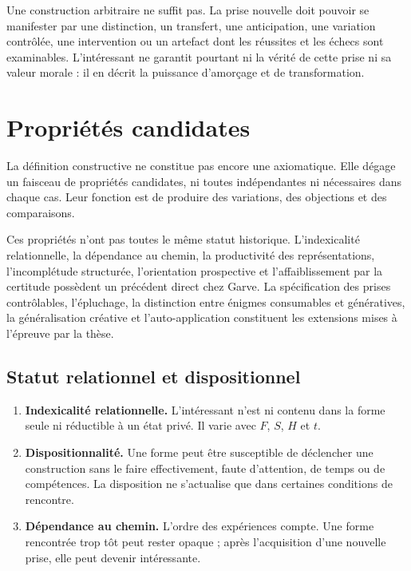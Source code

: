 \documentclass[11pt,a4paper]{article}
\begin{document}
Une construction arbitraire ne suffit pas. La prise nouvelle doit pouvoir se
manifester par une distinction, un transfert, une anticipation, une variation
contrôlée, une intervention ou un artefact dont les réussites et les échecs sont
examinables. L'intéressant ne garantit pourtant ni la vérité de cette prise ni
sa valeur morale : il en décrit la puissance d'amorçage et de transformation.

\section{Propriétés candidates}

La définition constructive ne constitue pas encore une axiomatique. Elle dégage
un faisceau de propriétés candidates, ni toutes indépendantes ni nécessaires
dans chaque cas. Leur fonction est de produire des variations, des objections
et des comparaisons.

Ces propriétés n'ont pas toutes le même statut historique. L'indexicalité
relationnelle, la dépendance au chemin, la productivité des représentations,
l'incomplétude structurée, l'orientation prospective et l'affaiblissement par
la certitude possèdent un précédent direct chez Garve. La spécification des
prises contrôlables, l'épluchage, la distinction entre énigmes consumables et
génératives, la généralisation créative et l'auto-application constituent les
extensions mises à l'épreuve par la thèse.

\subsection{Statut relationnel et dispositionnel}

\begin{enumerate}
  \item \textbf{Indexicalité relationnelle.} L'intéressant n'est ni contenu
        dans la forme seule ni réductible à un état privé. Il varie avec
        \(F\), \(S\), \(H\) et \(t\).
  \item \textbf{Dispositionnalité.} Une forme peut être susceptible de
        déclencher une construction sans le faire effectivement, faute
        d'attention, de temps ou de compétences. La disposition ne s'actualise
        que dans certaines conditions de rencontre.
  \item \textbf{Dépendance au chemin.} L'ordre des expériences compte. Une
        forme rencontrée trop tôt peut rester opaque ; après l'acquisition
        d'une nouvelle prise, elle peut devenir intéressante.
\end{enumerate}
\end{document}
